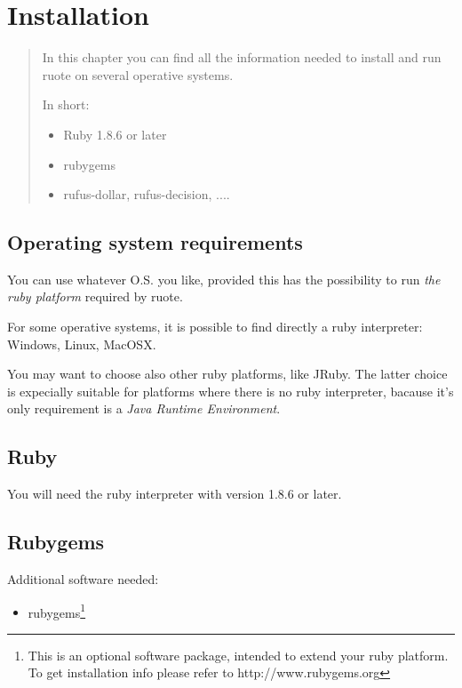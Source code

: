 
\chapter{Installation}

\begin{quotation}

In this chapter you can find all the information needed
to install and run ruote on several operative systems.

In short:
\begin{itemize}
 \item Ruby 1.8.6 or later
 \item rubygems
 \item rufus-dollar, rufus-decision, ....
\end{itemize}


\end{quotation} 

\vspace{1.5in}

\section{Operating system requirements}

You can use whatever O.S. you like, provided this has the possibility 
to run \emph{the ruby platform} required by ruote.

For some operative systems, it is possible to find directly a ruby 
interpreter: Windows, Linux, MacOSX.

You may want to choose also other ruby platforms, like JRuby. The latter
choice is expecially suitable for platforms where there is no ruby interpreter, 
bacause it's only requirement is a \emph{Java Runtime Environment}.


\section{Ruby}

You will need the ruby interpreter with version 1.8.6 or later.

\section{Rubygems}

Additional software needed:
\begin{itemize}
\item rubygems\footnote{This is an optional software package, 
intended to extend your ruby platform. To get  
installation info please refer to http://www.rubygems.org }

\end{itemize}

